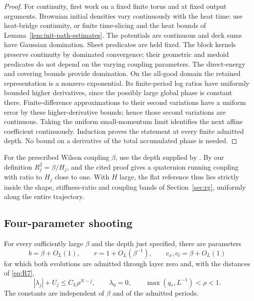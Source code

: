\begin{proof}
For continuity, first work on a fixed finite torus and at fixed output
arguments.  Brownian initial densities vary continuously with the heat
time: use heat-bridge continuity, or finite time-slicing and the heat
bounds of Lemma~\ref{lem:init-path-estimates}.  The potentials are
continuous and deck sums have Gaussian domination.  Sheet predicates
are held fixed.  The block kernels preserve continuity by dominated
convergence; their geometric and medoid predicates do not depend on
the varying coupling parameters.  The direct-energy and covering bounds
provide domination.  On the all-good domain the retained representation
is a nonzero exponential.  Its finite-period log ratios have uniformly
bounded higher derivatives, since the possibly large global phase is
constant there.  Finite-difference approximations to their second variations have a
uniform error by these higher-derivative bounds; hence those second
variations are continuous.  Taking the uniform small-momentum limit identifies the next affine
coefficient continuously.  Induction proves the statement at every
finite admitted depth.  No bound on a derivative of the total accumulated
phase is needed.
\end{proof}

For the prescribed Wilson coupling $\beta$, use the depth supplied by
\cite[Proposition ``Admission and shooting'']{SharpO4}.  By our definition
$R_j^2=\beta/H_j$, and the cited proof gives a quaternion running coupling
with ratio to $H_j$ close to one.  With $H$ large, the flat reference thus lies strictly
inside the shape, stiffness-ratio and coupling bands of
Section~\ref{sec:rg}, uniformly along the entire trajectory.

\subsection{Four-parameter shooting}

\begin{proposition}
\label{prop:cmp-shooting}
For every sufficiently large $\beta$ and the depth just specified, there
are parameters
\[
 b=\beta+O_L(1),\qquad r=1+O_L(\beta^{-1}),\qquad
 c_x,c_t=\beta+O_L(1)
\]
for which both evolutions are admitted through layer zero and, with the
distances of \eqref{eq:R7},
\begin{equation}
 |\lambda_j|+U_j\le C_L\rho^{N-j},\qquad \lambda_0=0,
 \qquad \max(q_*,L^{-1})<\rho<1.
 \label{eq:R15}
\end{equation}
The constants are independent of $\beta$ and of the admitted periods.
\end{proposition}

